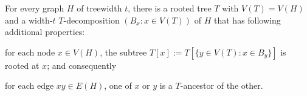 \documentclass{patmorin}
\newcommand{\tlabel}[1]{\label{t:#1}}
\renewcommand{\le}{\leqslant}
\begin{document}
\begin{lem}
  For every graph $H$ of treewidth $t$, there is a rooted tree $T$ with $V(T)=V(H)$ and a width-$t$ $T$-decomposition $(B_x:x\in V(T))$ of $H$ that has following additional properties:
  \begin{compactenum}[(T1)]
    \item\tlabel{subtree-root} for each node $x\in V(H)$, the subtree $T[x]:=T[\{y\in V(T):x\in B_y\}]$ is rooted at $x$; and consequently
    \item\tlabel{ancestor-edge}\tlabel{last} for each edge $xy\in E(H)$, one of $x$ or $y$ is a $T$-ancestor of the other.
  \end{compactenum}
\end{lem}
\end{document}
